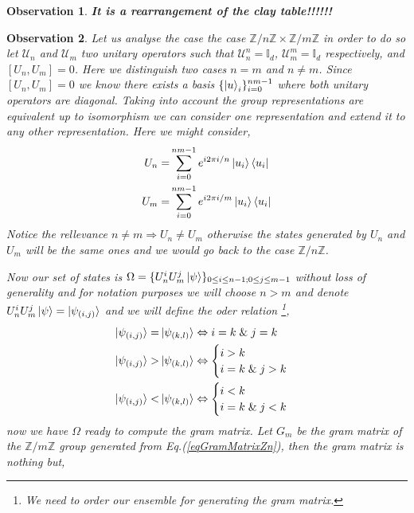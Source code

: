 \documentclass[12pt,letterpaper]{article}
\newtheorem{observation}{Observation}
\begin{document}
\begin{multicols}{2}
\begin{observation}
\textbf{It is a rearrangement of the clay table!!!!!!}
\end{observation}


\begin{observation}\label{ObsZnZm}
Let us analyse the case the case $\mathbb{Z}/n\mathbb{Z}\times\mathbb{Z}/m\mathbb{Z}$ in order to do so let $\mathcal{U}_n$ and $\mathcal{U}_m$ two unitary operators such that $\mathcal{U}_n^n=\mathbb{I}_d$, $\mathcal{U}_m^m=\mathbb{I}_d$ respectively, and $[U_n,U_m]=0$. Here we distinguish two cases $n=m$ and $n\neq m$. Since $[U_n,U_m]=0$ we know there exists a basis $\{\ket{u}_i\}_{i=0}^{nm-1}$ where both unitary operators are diagonal. Taking into account the group representations are equivalent up to isomorphism we can consider one representation and extend it to any other representation. Here we might consider,
\begin{align}
U_n=&\sum_{i=0}^{nm-1}e^{i2\pi i/n}\ket{u_i}\bra{u_i}\\
U_m=&\sum_{i=0}^{nm-1}e^{i2\pi i/m}\ket{u_i}\bra{u_i}
\end{align}
Notice the rellevance $n\neq m\Rightarrow U_n\neq U_m$ otherwise the states generated by $U_n$ and $U_m$ will be the same ones and we would go back to the case $\mathbb{Z}/n\mathbb{Z}$. \par
Now our set of states is $\Omega=\{U_{n}^iU_{m}^j\ket{\psi}\}_{0\leq i\leq n-1; 0\leq j\leq m-1}$ without loss of generality and for notation purposes we will choose $n>m$ and denote $U_{n}^iU_{m}^j\ket{\psi}=\ket{\psi_{(i,j)}}$ and we will define the oder relation \footnote{We need to order our ensemble for generating the gram matrix.},
\begin{align}
\ket{\psi_{(i,j)}}=&\ket{\psi_{(k,l)}}\Leftrightarrow i=k\;\&\;j=k\\
\ket{\psi_{(i,j)}}>&\ket{\psi_{(k,l)}}\Leftrightarrow\begin{cases}i>k\\i=k\;\&\;j>k\end{cases}\\
\ket{\psi_{(i,j)}}<&\ket{\psi_{(k,l)}}\Leftrightarrow\begin{cases}i<k\\i=k\;\&\;j<k\end{cases}
\end{align}
now we have $\Omega$ ready to compute the gram matrix. Let $G_m$ be the gram matrix of the $\mathbb{Z}/m\mathbb{Z}$ group generated from Eq.(\ref{eqGramMatrixZn}), then the gram matrix is nothing but,
\end{observation}
\end{multicols}
\end{document}
